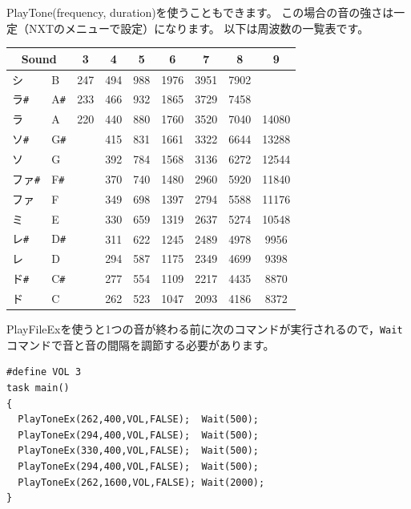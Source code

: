 \documentclass[11pt]{jarticle}
\begin{document}
PlayTone(frequency, duration)を使うこともできます。
この場合の音の強さは一定（NXTのメニューで設定）になります。
以下は周波数の一覧表です。

\begin{center}{\small
\begin{tabular}{ll|ccccccc}  \\ \hline
    \multicolumn{2}{c|}{\textbf{Sound}} &    \textbf{3}&       \textbf{4}&       \textbf{5}&          \textbf{6}&        \textbf{7}&            \textbf{8}&    \textbf{9}  \\  \hline
シ&B &        247&  494&   988&  1976&  3951&  7902&      \\
ラ\verb|#|&A\verb|#|  &       233&  466&  932 &  1865&  3729&  7458&       \\
ラ&A&       220&   440&  880&  1760&  3520&  7040&  14080\\ 
ソ\verb|#|&G\verb|#|&           &  415  &  831  &  1661  &  3322  &  6644  &  13288 \\
ソ&G   &          &  392  &  784  &  1568  &  3136  &  6272  &  12544 \\ 
ファ\verb|#|&F\verb|#| &           &  370  &  740  &  1480  &   2960  &  5920  &  11840 \\ 
ファ&F   &           &  349  &  698  &  1397  &  2794  &  5588  &  11176 \\
ミ&E   &           &  330  &  659  &  1319  &  2637  &  5274  &  10548 \\ 
レ\verb|#|&D\verb|#| &          &   311  &  622  &  1245  &  2489  &  4978  &  9956 \\ 
レ&D   &          &  294  &  587  &  1175  &  2349  &  4699  &  9398  \\ 
ド\verb|#|&C\verb|#| &         &   277  &  554  &  1109  &  2217  &  4435  &  8870 \\  
ド&C   &         &  262  &  523  &  1047  &  2093  &  4186  &  8372 \\ \hline
\end{tabular}}
\end{center}


PlayFileExを使うと1つの音が終わる前に次のコマンドが実行されるので，\verb|Wait|コマンドで音と音の間隔を調節する必要があります。

\begin{screen}{\small
\begin{verbatim}
#define VOL 3 
task main() 
{ 
  PlayToneEx(262,400,VOL,FALSE);  Wait(500); 
  PlayToneEx(294,400,VOL,FALSE);  Wait(500); 
  PlayToneEx(330,400,VOL,FALSE);  Wait(500); 
  PlayToneEx(294,400,VOL,FALSE);  Wait(500); 
  PlayToneEx(262,1600,VOL,FALSE); Wait(2000); 
} 
\end{verbatim}}
\end{screen}
\end{document}
